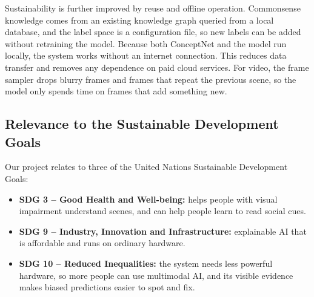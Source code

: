 Sustainability is further improved by reuse and offline operation. Commonsense knowledge comes from an existing knowledge graph queried from a local database, and the label space is a configuration file, so new labels can be added without retraining the model. Because both ConceptNet and the model run locally, the system works without an internet connection. This reduces data transfer and removes any dependence on paid cloud services. For video, the frame sampler drops blurry frames and frames that repeat the previous scene, so the model only spends time on frames that add something new.

\subsection{Relevance to the Sustainable Development Goals}

Our project relates to three of the United Nations Sustainable Development Goals:
\begin{itemize}
\item \textbf{SDG 3 -- Good Health and Well-being:} helps people with visual impairment understand scenes, and can help people learn to read social cues.
\item \textbf{SDG 9 -- Industry, Innovation and Infrastructure:} explainable AI that is affordable and runs on ordinary hardware.
\item \textbf{SDG 10 -- Reduced Inequalities:} the system needs less powerful hardware, so more people can use multimodal AI, and its visible evidence makes biased predictions easier to spot and fix.
\end{itemize}
